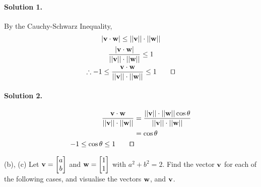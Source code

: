 \paragraph{Solution 1.}
By the Cauchy-Schwarz Inequality,
\begin{gather*}
    |\vb{v}\cdot\vb{w}|\leq||\vb{v}||\cdot||\vb{w}||\\
    \frac{|\vb{v}\cdot\vb{w}|}{||\vb{v}||\cdot||\vb{w}||}\leq1\\
    \therefore -1\leq\frac{\vb{v}\cdot\vb{w}}{||\vb{v}||\cdot||\vb{w}||}\leq1\tag*{$\qed$}
\end{gather*}
\paragraph{Solution 2.}
\begin{align*}
    \frac{\vb{v}\cdot\vb{w}}{||\vb{v}||\cdot||\vb{w}||}&= \frac{||\vb{v}||\cdot||\vb{w}||\cos\theta}{||\vb{v}||\cdot||\vb{w}||}\\&= \cos\theta\\
    -1 \leq \cos\theta \leq 1\tag*{$\qed$}
\end{align*}

(b), (c) Let $\vb{v}=\begin{bmatrix}
    a\\b
\end{bmatrix}$ and $\vb{w} = \begin{bmatrix}
    1\\1
\end{bmatrix}$ with $a^2+b^2=2$. Find the vector $\vb{v}$ for each of the following cases, and visualise the vectors $\vb{w}$, and $\vb{v}$.
